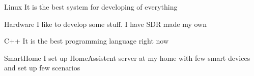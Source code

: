 



\begin{cvskills}

  \cvskill
    {Linux} %
    {It is the best system for developing of everything} %

  \cvskill
    {Hardware} %
    {I like to develop some stuff. I have SDR made my own} %
    
  \cvskill
    {C++} %
    {It is the best programming language right now} %
    
  \cvskill
    {SmartHome} %
    {I set up HomeAssistent server at my home with few smart devices and set up few scenarios} %

\end{cvskills}